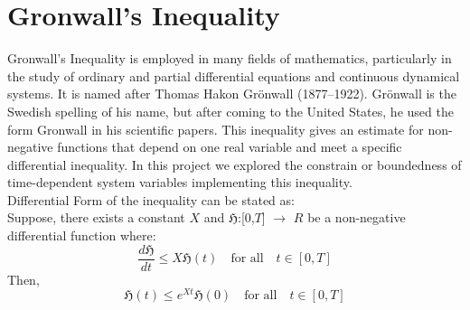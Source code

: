 \documentclass[12pt,a4wide]{report}
\numberwithin{equation}{chapter}
\numberwithin{theorem}{chapter}
\begin{document}
\section*{Gronwall's Inequality}
Gronwall's Inequality is employed in many fields of mathematics, particularly in the study of ordinary and partial differential equations and continuous dynamical systems. It is named after Thomas Hakon Grönwall (1877–1922). Grönwall is the Swedish spelling of his name, but after coming to the United States, he used the form Gronwall in his scientific papers. This inequality gives an estimate for non-negative functions that depend on one real variable and meet a specific differential inequality. In this project we explored the constrain or boundedness of time-dependent system variables implementing this inequality.\\
Differential Form of the inequality can be stated as:\\
Suppose, there exists a constant $X$ and $\mathfrak{H} $:[0,$T$] $\rightarrow$ $R$ be a non-negative differential function where:\\
\vspace{-1cm}
\begin{equation*}
\frac{d\mathfrak{H}}{dt} \leq X \mathfrak{H}(t) \quad \text{for all} \quad t\in [0,T]
\end{equation*}
\vspace{-1cm}
Then,\\
\begin{equation*}
\mathfrak{H}(t) \leq e^{Xt}\mathfrak{H}(0) \quad \text{for all} \quad t \in [0,T]
\end{equation*}
\end{document}
